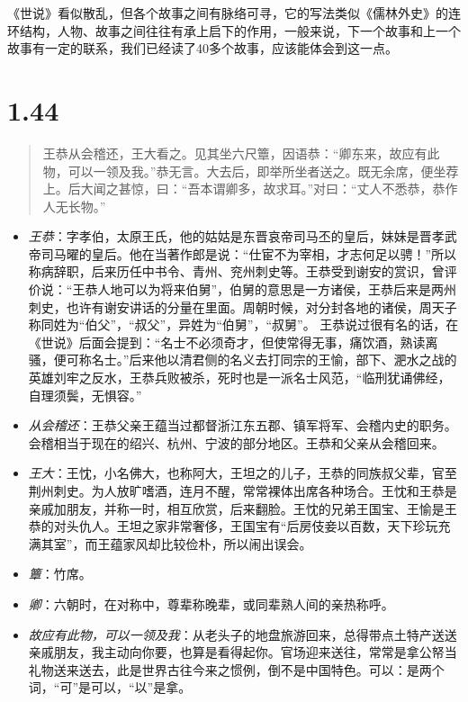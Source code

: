 \documentclass[]{book}
\providecommand{\tightlist}{%
  \setlength{\itemsep}{0pt}\setlength{\parskip}{0pt}}
\begin{document}
《世说》看似散乱，但各个故事之间有脉络可寻，它的写法类似《儒林外史》的连环结构，人物、故事之间往往有承上启下的作用，一般来说，下一个故事和上一个故事有一定的联系，我们已经读了40多个故事，应该能体会到这一点。

\section{1.44}\label{section-43}

\begin{quote}
王恭从会稽还，王大看之。见其坐六尺簟，因语恭：``卿东来，故应有此物，可以一领及我。''恭无言。大去后，即举所坐者送之。既无余席，便坐荐上。后大闻之甚惊，曰：``吾本谓卿多，故求耳。''对曰：``丈人不悉恭，恭作人无长物。''
\end{quote}

\begin{itemize}
\tightlist
\item
  \emph{王恭}：字孝伯，太原王氏，他的姑姑是东晋哀帝司马丕的皇后，妹妹是晋孝武帝司马曜的皇后。他在当著作郎是说：``仕宦不为宰相，才志何足以骋！''所以称病辞职，后来历任中书令、青州、兖州刺史等。王恭受到谢安的赏识，曾评价说：``王恭人地可以为将来伯舅''，伯舅的意思是一方诸侯，王恭后来是两州刺史，也许有谢安讲话的分量在里面。周朝时候，对分封各地的诸侯，周天子称同姓为``伯父''，``叔父''，异姓为``伯舅''，``叔舅''。
  王恭说过很有名的话，在《世说》后面会提到：``名士不必须奇才，但使常得无事，痛饮酒，熟读离骚，便可称名士。''后来他以清君侧的名义去打同宗的王愉，部下、淝水之战的英雄刘牢之反水，王恭兵败被杀，死时也是一派名士风范，``临刑犹诵佛经，自理须鬓，无惧容。''
\item
  \emph{从会稽还}：王恭父亲王蕴当过都督浙江东五郡、镇军将军、会稽内史的职务。会稽相当于现在的绍兴、杭州、宁波的部分地区。王恭和父亲从会稽回来。
\item
  \emph{王大}：王忱，小名佛大，也称阿大，王坦之的儿子，王恭的同族叔父辈，官至荆州刺史。为人放旷嗜酒，连月不醒，常常裸体出席各种场合。王忱和王恭是亲戚加朋友，并称一时，相互欣赏，后来翻脸。王忱的兄弟王国宝、王愉是王恭的对头仇人。王坦之家非常奢侈，王国宝有``后房伎妾以百数，天下珍玩充满其室''，而王蕴家风却比较俭朴，所以闹出误会。
\item
  \emph{簟}：竹席。
\item
  \emph{卿}：六朝时，在对称中，尊辈称晚辈，或同辈熟人间的亲热称呼。
\item
  \emph{故应有此物，可以一领及我}：从老头子的地盘旅游回来，总得带点土特产送送亲戚朋友，我主动向你要，也算是看得起你。官场迎来送往，常常是拿公帑当礼物送来送去，此是世界古往今来之惯例，倒不是中国特色。可以：是两个词，``可''是可以，``以''是拿。

\end{itemize}
\end{document}
